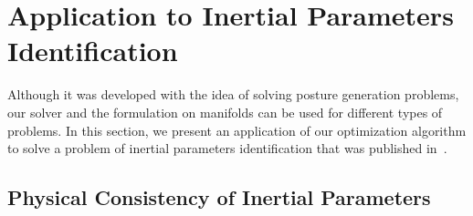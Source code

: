 \FloatBarrier
\section{Application to Inertial Parameters Identification}
\label{sec:inertial_parameters}

Although it was developed with the idea of solving posture generation problems, our solver and the formulation on manifolds can be used for different types of problems.
In this section, we present an application of our optimization algorithm to solve a problem of inertial parameters identification that was published in~\cite{traversaro:iros:2016}.

\subsection{Physical Consistency of Inertial Parameters}
\label{sub:physical_consistency_of_inertial_parameters}

